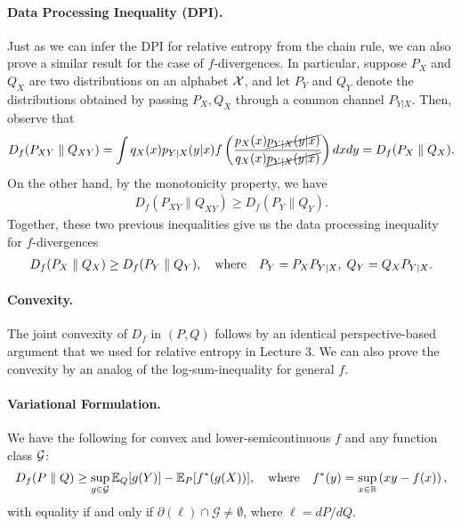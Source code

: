\documentclass[12pt]{article}
\begin{document}
\paragraph{Data Processing Inequality (DPI).} Just as we can infer the DPI for relative entropy from the chain rule, we can also prove a similar result for the case of $f$-divergences. In particular, suppose $P_X$ and $Q_X$ are two distributions on an alphabet ${\cal X}$, and let $P_Y$ and $Q_Y$ denote the distributions obtained by passing $P_X, Q_X$ through a common channel $P_{Y|X}$. Then, observe that 
\begin{align}
	D_f(P_{XY} \parallel Q_{XY}) = \int q_X(x) p_{Y|X}(y|x) f \left( \frac{p_X(x) \cancel{p_{Y|X}(y|x)}}{q_X(x) \cancel{p_{Y|X}(y|x)}} \right) dx dy = D_f(P_X \parallel Q_X). 
\end{align}
On the other hand, by the monotonicity property, we have 
\begin{align}
D_f(P_{XY} \parallel Q_{XY}) \geq D_f(P_Y \parallel Q_Y). 
\end{align}
Together, these two previous inequalities give us the data processing inequality for $f$-divergences 
\begin{align}
D_f(P_{X} \parallel Q_X) \geq D_f(P_Y \parallel Q_Y), \quad \text{where} \quad P_Y = P_X P_{Y|X}, \; Q_Y = Q_X P_{Y|X}. 
\end{align}

\paragraph{Convexity.} The joint convexity of $D_f$ in $(P,Q)$ follows by an identical perspective-based argument that we used for relative entropy in Lecture 3.  We can also prove the convexity by an analog of the log-sum-inequality for general $f$. 

\paragraph{Variational Formulation.} We have the following for convex and lower-semicontinuous $f$ and any function class ${\cal G}$: 
\begin{align}
D_f(P\parallel Q) \geq \sup_{g \in {\cal G}} \mathbb{E}_Q[g(Y)] - \mathbb{E}_P[f^*(g(X))], \quad \text{where} \quad f^*(y) = \sup_{x \in \mathbb{R}} \left( x y - f(x) \right), 
\end{align}
with equality if and only if $ \partial(\ell) \cap  \mathcal{G} \not= \emptyset$, where $\ell = dP/dQ$. 
\end{document}
